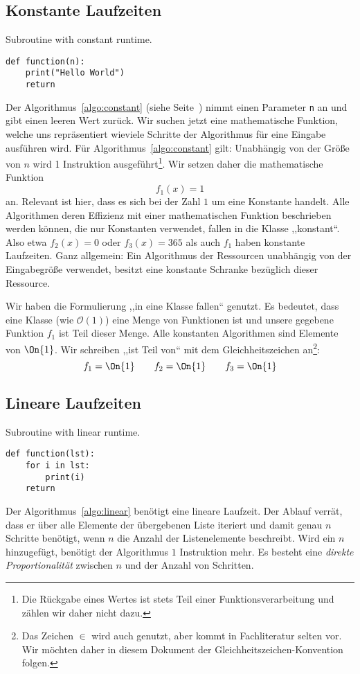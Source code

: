 \subsection{Konstante Laufzeiten}
%
\begin{algorithm}[p]
\caption{Subroutine with constant runtime.}
\label{algo:constant}
\begin{lstlisting}
def function(n):
    print("Hello World")
    return
\end{lstlisting}
\end{algorithm}
%
Der Algorithmus~\ref{algo:constant} (siehe Seite~\pageref{algo:constant}) nimmt einen Parameter \texttt{n} an und gibt einen leeren Wert zurück. Wir suchen jetzt eine mathematische Funktion, welche uns repräsentiert wieviele Schritte der Algorithmus für eine Eingabe ausführen wird. Für Algorithmus~\ref{algo:constant} gilt: Unabhängig von der Größe von $n$ wird 1 Instruktion ausgeführt\footnote{Die Rückgabe eines Wertes ist stets Teil einer Funktionsverarbeitung und zählen wir daher nicht dazu.}. Wir setzen daher die mathematische Funktion
\[
  f_1(x) = 1
\]
an. Relevant ist hier, dass es sich bei der Zahl $1$ um eine Konstante handelt. Alle Algorithmen deren Effizienz mit einer mathematischen Funktion beschrieben werden können, die nur Konstanten verwendet, fallen in die Klasse ,,konstant``. Also etwa $f_2(x) = 0$ oder $f_3(x) = 365$ als auch $f_1$ haben konstante Laufzeiten. Ganz allgemein: Ein Algorithmus der Ressourcen unabhängig von der Eingabegröße verwendet, besitzt eine konstante Schranke bezüglich dieser Ressource.

Wir haben die Formulierung ,,in eine Klasse fallen`` genutzt. Es bedeutet, dass eine Klasse (wie $\mathcal{O}(1)$) eine Menge von Funktionen ist und unsere gegebene Funktion $f_1$ ist Teil dieser Menge. Alle konstanten Algorithmen sind Elemente von $\On{1}$. Wir schreiben ,,ist Teil von`` mit dem Gleichheitszeichen an\footnote{Das Zeichen $\in$ wird auch genutzt, aber kommt in Fachliteratur selten vor. Wir möchten daher in diesem Dokument der Gleichheitszeichen-Konvention folgen.}:
\[
    f_1 = \On{1} \qquad f_2 = \On{1} \qquad f_3 = \On{1}
\]
%
\subsection{Lineare Laufzeiten}
%
\begin{algorithm}[p]
\caption{Subroutine with linear runtime.}
\label{algo:linear}
\begin{lstlisting}
def function(lst):
    for i in lst:
        print(i)
    return
\end{lstlisting}
\end{algorithm}
%
Der Algorithmus~\ref{algo:linear} benötigt eine lineare Laufzeit. Der Ablauf verrät, dass er über alle Elemente der übergebenen Liste iteriert und damit genau $n$ Schritte benötigt, wenn $n$ die Anzahl der Listenelemente beschreibt. Wird ein $n$ hinzugefügt, benötigt der Algorithmus $1$ Instruktion mehr. Es besteht eine \emph{direkte Proportionalität} zwischen $n$ und der Anzahl von Schritten.

